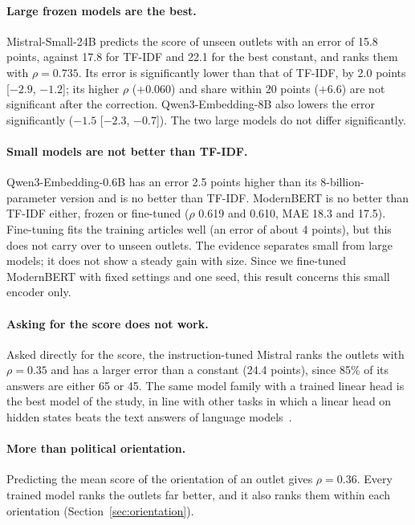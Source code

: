 \documentclass[11pt,a4paper]{article}
\begin{document}
\paragraph{Large frozen models are the best.} Mistral-Small-24B predicts the score of unseen outlets with an error of
15.8 points, against 17.8 for TF-IDF and 22.1 for the best constant, and ranks them with $\rho = 0.735$. Its error is
significantly lower than that of TF-IDF, by 2.0 points [$-2.9$, $-1.2$]; its higher $\rho$ ($+0.060$) and share within
20 points ($+6.6$) are not significant after the correction. Qwen3-Embedding-8B also lowers the error significantly
($-1.5$ [$-2.3$, $-0.7$]). The two large models do not differ significantly.

\paragraph{Small models are not better than TF-IDF.} Qwen3-Embedding-0.6B has an error 2.5 points higher than its
8-billion-parameter version and is no better than TF-IDF. ModernBERT is no better than TF-IDF either, frozen or
fine-tuned ($\rho$ 0.619 and 0.610, MAE 18.3 and 17.5). Fine-tuning fits the training articles well (an error of about 4
points), but this does not carry over to unseen outlets. The evidence separates small from large models; it does not show
a steady gain with size. Since we fine-tuned ModernBERT with fixed settings and one seed, this result concerns this small
encoder only.

\paragraph{Asking for the score does not work.} Asked directly for the score, the instruction-tuned Mistral ranks the
outlets with $\rho = 0.35$ and has a larger error than a constant (24.4 points), since 85\% of its answers are either 65
or 45. The same model family with a trained linear head is the best model of the study, in line with other tasks in
which a linear head on hidden states beats the text answers of language models~\cite{buckmann2025revealing}.

\paragraph{More than political orientation.} Predicting the mean score of the orientation of an outlet gives
$\rho = 0.36$. Every trained model ranks the outlets far better, and it also ranks them within each orientation
(Section~\ref{sec:orientation}).
\end{document}
